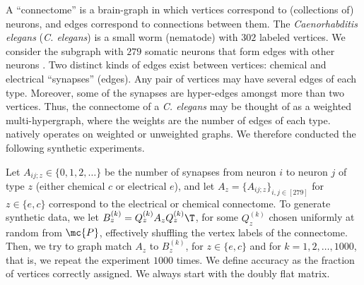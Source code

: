 \documentclass[10pt,journal,cspaper,compsoc]{IEEEtran}
\begin{document}
A ``connectome'' is a brain-graph in which vertices correspond to (collections of) neurons, and edges correspond to connections between them. The \emph{Caenorhabditis elegans} (\emph{C. elegans}) is a small worm (nematode) with $302$ labeled vertices.  We consider the subgraph with $279$ somatic neurons that form edges with other neurons \cite{WhiteBrenner86, Varshney2011}.  Two distinct kinds of edges exist between vertices: chemical and electrical ``synapses'' (edges). Any pair of vertices may have several edges of each type. Moreover, some of the synapses are hyper-edges amongst more than two vertices.   Thus, the connectome of a \emph{C. elegans} may be thought of as a weighted multi-hypergraph, where the weights are the number of edges of each type.  \FAQ natively operates on weighted or unweighted graphs.  We therefore conducted the following synthetic experiments.  

Let $A_{ij;z} \in \{0,1,2,\ldots\}$ be the number of synapses from neuron $i$ to neuron $j$ of type $z$ (either chemical $c$ or electrical $e$), and let $A_z=\{A_{ij;z}\}_{i,j \in [279]}$ for $z \in \{e,c\}$ correspond to the electrical or chemical connectome.  To generate synthetic data, we let $B_z^{(k)}=Q_z^{(k)} A_z {Q_z^{(k)}}\T$, for some $Q_z^{(k)}$ chosen uniformly at random from $\mc{P}$, effectively shuffling the vertex labels of the connectome.  Then, we try to graph match $A_z$ to $B_z^{(k)}$, for $z \in \{e,c\}$ and for $k =1,2,\ldots, 1000$, that is, we repeat the experiment $1000$ times.  We define accuracy as the fraction of vertices correctly assigned. We always start with the doubly flat matrix.

\end{document}

